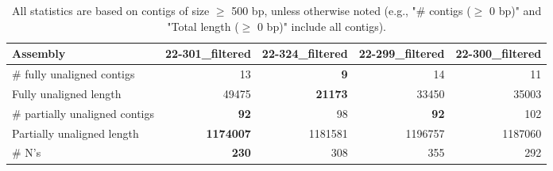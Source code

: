 \documentclass[12pt,a4paper]{article}
\begin{document}
\begin{table}[ht]
\begin{center}
\caption{All statistics are based on contigs of size $\geq$ 500 bp, unless otherwise noted (e.g., "\# contigs ($\geq$ 0 bp)" and "Total length ($\geq$ 0 bp)" include all contigs).}
\begin{tabular}{|l*{4}{|r}|}
\hline
Assembly & 22-301\_filtered & 22-324\_filtered & 22-299\_filtered & 22-300\_filtered \\ \hline
\# fully unaligned contigs & 13 & {\bf 9} & 14 & 11 \\ \hline
Fully unaligned length & 49475 & {\bf 21173} & 33450 & 35003 \\ \hline
\# partially unaligned contigs & {\bf 92} & 98 & {\bf 92} & 102 \\ \hline
Partially unaligned length & {\bf 1174007} & 1181581 & 1196757 & 1187060 \\ \hline
\# N's & {\bf 230} & 308 & 355 & 292 \\ \hline
\end{tabular}
\end{center}
\end{table}
\end{document}
